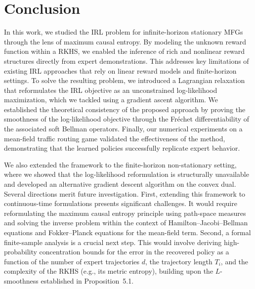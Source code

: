 \documentclass[11pt]{article}
\begin{document}
\section{Conclusion}
{\color{black}
In this work, we studied the IRL problem for infinite-horizon stationary MFGs through the lens of maximum causal entropy. By modeling the unknown reward function within a RKHS, we enabled the inference of rich and nonlinear reward structures directly from expert demonstrations. This addresses key limitations of existing IRL approaches that rely on linear reward models and finite-horizon settings. To solve the resulting problem, we introduced a Lagrangian relaxation that reformulates the IRL objective as an unconstrained log-likelihood maximization, which we tackled using a gradient ascent algorithm. We established the theoretical consistency of the proposed approach by proving the smoothness of the log-likelihood objective through the Fr\'echet differentiability of the associated soft Bellman operators. Finally, our numerical experiments on a mean-field traffic routing game validated the effectiveness of the method, demonstrating that the learned policies successfully replicate expert behavior.
}


We also extended the framework to the finite-horizon non-stationary setting, where we showed that the log-likelihood reformulation is structurally unavailable and developed an alternative gradient descent algorithm on the convex dual. Several directions merit future investigation. First, extending this framework to continuous-time formulations presents significant challenges. It would require reformulating the maximum causal entropy principle using path-space measures and solving the inverse problem within the context of Hamilton--Jacobi--Bellman equations and Fokker--Planck equations for the mean-field term. Second, a formal finite-sample analysis is a crucial next step. This would involve deriving high-probability concentration bounds for the error in the recovered policy as a function of the number of expert trajectories $d$, the trajectory length $T_i$, and the complexity of the RKHS (e.g., its metric entropy), building upon the $L$-smoothness established in Proposition~5.1.



 
\end{document}
